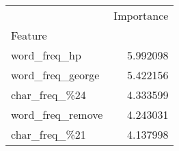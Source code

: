 \begin{tabular}{lr}
\toprule
{} &  Importance \\
Feature          &             \\
\midrule
word\_freq\_hp     &    5.992098 \\
word\_freq\_george &    5.422156 \\
char\_freq\_\%24    &    4.333599 \\
word\_freq\_remove &    4.243031 \\
char\_freq\_\%21    &    4.137998 \\
\bottomrule
\end{tabular}
